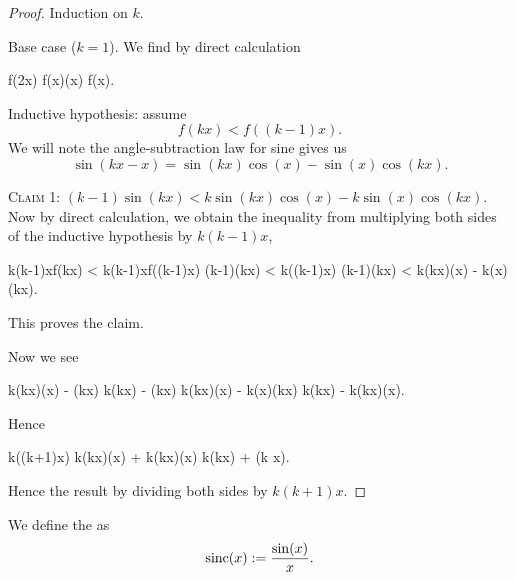 \begin{proof}
Induction on $k$.

Base case ($k=1$). We find by direct calculation
\begin{calculation}
f(2x)
f(x)\cos(x)
f(x).
\end{calculation}

Inductive hypothesis: assume
\begin{equation}
f(kx) < f((k-1)x).
\end{equation}
We will note the angle-subtraction law for sine gives us
\begin{equation}
\sin(kx - x) = \sin(kx)\cos(x) - \sin(x)\cos(kx).
\end{equation}

\textsc{Claim 1:} $(k-1)\sin(kx) < k\sin(kx)\cos(x) - k\sin(x)\cos(kx).$
Now by direct calculation, we obtain the inequality from multiplying
both sides of the inductive hypothesis by $k(k-1)x$,
\begin{calculation}
k(k-1)xf(kx) < k(k-1)xf((k-1)x)
(k-1)\sin(kx) < k\sin((k-1)x)
(k-1)\sin(kx) < k\sin(kx)\cos(x) - k\sin(x)\cos(kx).
\end{calculation}
This proves the claim.

Now we see
\begin{calculation}
k\sin(kx)\cos(x) - \sin(kx)
k\sin(kx) - \sin(kx)
k\sin(kx)\cos(x) - k\sin(x)\cos(kx)
k\sin(kx) - k\cos(kx)\sin(x).
\end{calculation}
Hence
\begin{calculation}
k\sin((k+1)x)
k\sin(kx)\cos(x) + k\cos(kx)\sin(x)
k\sin(kx) + \sin(k x).
\end{calculation}
Hence the result by dividing both sides by $k(k+1)x$.
\end{proof}

\begin{definition}
We define the  as
\begin{equation}
\operatorname{sinc}(x) := \frac{\sin(x)}{x}.
\end{equation}
\end{definition}

